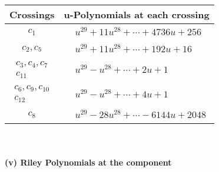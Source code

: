 \documentclass[1p]{elsarticle_modified}
\theoremstyle{definition}
\begin{document}
\begin{tabular}{m{50pt}|m{274pt}}
Crossings & \hspace{64pt}u-Polynomials at each crossing \\
\hline $$\begin{aligned}c_{1}\end{aligned}$$&$\begin{aligned}
&u^{29}+11 u^{28}+\cdots+4736 u+256
\end{aligned}$\\
\hline $$\begin{aligned}c_{2},c_{5}\end{aligned}$$&$\begin{aligned}
&u^{29}+11 u^{28}+\cdots+192 u+16
\end{aligned}$\\
\hline $$\begin{aligned}c_{3},c_{4},c_{7}\\c_{11}\end{aligned}$$&$\begin{aligned}
&u^{29}- u^{28}+\cdots+2 u+1
\end{aligned}$\\
\hline $$\begin{aligned}c_{6},c_{9},c_{10}\\c_{12}\end{aligned}$$&$\begin{aligned}
&u^{29}- u^{28}+\cdots+4 u+1
\end{aligned}$\\
\hline $$\begin{aligned}c_{8}\end{aligned}$$&$\begin{aligned}
&u^{29}-28 u^{28}+\cdots-6144 u+2048
\end{aligned}$\\
\hline
\end{tabular}\\~\\
\newpage\renewcommand{\arraystretch}{1}
\flushleft \textbf{(v) Riley Polynomials at the component}\newline \\
\end{document}
